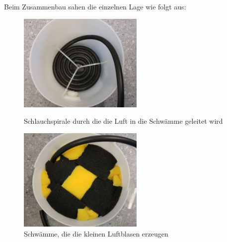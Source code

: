 Beim Zusammenbau sahen die einzelnen Lage wie folgt aus:

\begin{figure}[h!]
	\begin{minipage}[hbt]{6cm}
		\centering
		\includegraphics[width=6cm]{Luftbefeuchter_Spirale.jpg}
		\caption[Spirale Luftbefeuchter]{Schlauchspirale durch die die Luft in die Schwämme geleitet wird}
	\end{minipage}
	\hfill
	\begin{minipage}[hbt]{6cm}
		\centering
		\includegraphics[width=6cm]{Luftbefeuchter_Schwaemme.jpg}
		\caption[Schwämme Luftbefeuchter]{Schwämme, die die kleinen Luftblasen erzeugen}
	\end{minipage}
\end{figure}

